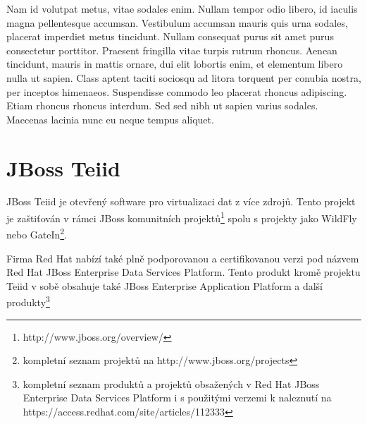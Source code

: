 \documentclass[oneside,12pt,final]{fithesis2}
\begin{document}
Nam id volutpat metus, vitae sodales enim. Nullam tempor odio libero, id iaculis magna pellentesque accumsan. Vestibulum accumsan mauris quis urna sodales, placerat imperdiet metus tincidunt. Nullam consequat purus sit amet purus consectetur porttitor. Praesent fringilla vitae turpis rutrum rhoncus. Aenean tincidunt, mauris in mattis ornare, dui elit lobortis enim, et elementum libero nulla ut sapien. Class aptent taciti sociosqu ad litora torquent per conubia nostra, per inceptos himenaeos. Suspendisse commodo leo placerat rhoncus adipiscing. Etiam rhoncus rhoncus interdum. Sed sed nibh ut sapien varius sodales. Maecenas lacinia nunc eu neque tempus aliquet.




\chapter{JBoss Teiid}
JBoss Teiid je otevřený software pro virtualizaci dat z více zdrojů. Tento projekt je zaštiťován v rámci JBoss komunitních projektů\footnote{http://www.jboss.org/overview/} spolu s projekty jako WildFly nebo GateIn\footnote{kompletní seznam projektů na http://www.jboss.org/projects}.

Firma Red Hat nabízí také plně podporovanou a certifikovanou verzi pod názvem Red Hat JBoss Enterprise Data Services Platform. Tento produkt kromě projektu Teiid v sobě obsahuje také JBoss Enterprise Application Platform a další produkty\footnote{kompletní seznam produktů a projektů obsažených v Red Hat JBoss Enterprise Data Services Platform i s použitými verzemi k naleznutí na https://access.redhat.com/site/articles/112333}
\end{document}
